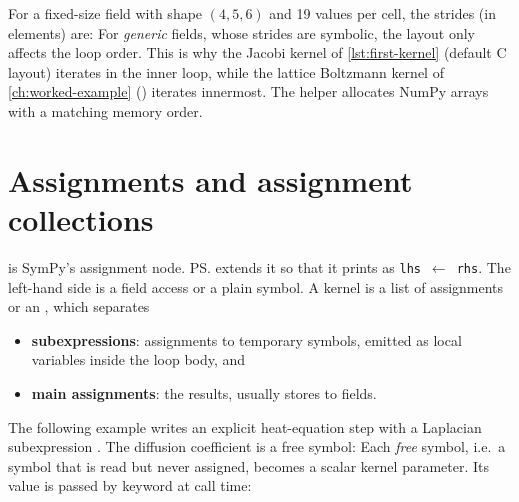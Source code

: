 For a fixed-size field with shape $(4,5,6)$ and 19 values per cell, the strides (in
elements) are:
For \emph{generic} fields, whose strides are symbolic, the layout only affects the loop
order. This is why the Jacobi kernel of \cref{lst:first-kernel} (default C layout)
iterates  in the inner loop, while the lattice Boltzmann kernel of
\cref{ch:worked-example} () iterates  innermost. The helper
 allocates NumPy
arrays with a matching memory order.

\section{Assignments and assignment collections}\label{sec:assignments}

 is SymPy's assignment node. \ps{} extends it so that it
prints as \texttt{lhs}~$\leftarrow$~\texttt{rhs}. The left-hand side is a field access or a plain symbol. A
kernel is a list of assignments or an , which separates
\begin{itemize}
  \item \textbf{subexpressions}: assignments to temporary symbols, emitted as local
         variables inside the loop body, and
  \item \textbf{main assignments}: the results, usually stores to fields.
\end{itemize}
The following example writes an explicit heat-equation step with a Laplacian
subexpression . The diffusion coefficient  is a free symbol:
Each \emph{free} symbol, i.e.\ a symbol that is read but never assigned, becomes a
scalar kernel parameter. Its value is passed by keyword at call time:

